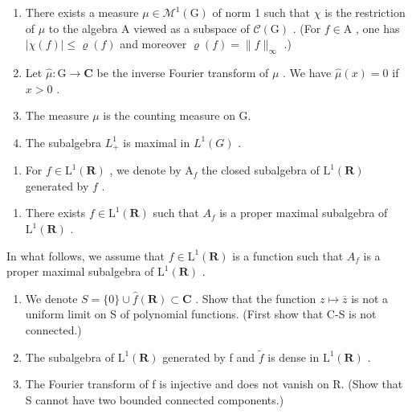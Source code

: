 \begin{enumerate}
\def\labelenumi{\alph{enumi})}
\setcounter{enumi}{4}
\item
  There exists a measure \(\mu \in \mathcal{M}^1 (\mathrm{G})\) of norm 1 such that \(\chi\) is the restriction of \(\mu\) to the algebra A viewed as a subspace of \(\mathcal{C}(\mathrm{G})\) . (For \(f\in \mathrm{A}\) , one has \(|\chi (f)|\leqslant \varrho (f)\) and moreover \(\varrho (f) = \| f\|_{\infty}\) .)
\item
  Let \(\widehat{\mu}\colon\mathrm{G}\to\mathbf{C}\) be the inverse Fourier transform of \(\mu\) . We have \(\widehat{\mu}(x)=0\) if \(x>0\) .
\item
  The measure \(\mu\) is the counting measure on G.
\item
  The subalgebra \(L_{+}^{1}\) is maximal in \(L^{1}(G)\) .
\end{enumerate}

\begin{enumerate}
\def\labelenumi{\arabic{enumi})}
\setcounter{enumi}{18}
\tightlist
\item
  For \(f \in \mathrm{L}^1(\mathbf{R})\) , we denote by \(\mathrm{A}_f\) the closed subalgebra of \(\mathrm{L}^1(\mathbf{R})\) generated by \(f\) .
\end{enumerate}

\begin{enumerate}
\def\labelenumi{\alph{enumi})}
\tightlist
\item
  There exists \(f \in \mathrm{L}^{1}(\mathbf{R})\) such that \(A_{f}\) is a proper maximal subalgebra of \(\mathrm{L}^{1}(\mathbf{R})\) .
\end{enumerate}

In what follows, we assume that \(f \in \mathrm{L}^{1}(\mathbf{R})\) is a function such that \(A_{f}\) is a proper maximal subalgebra of \(\mathrm{L}^{1}(\mathbf{R})\) .

\begin{enumerate}
\def\labelenumi{\alph{enumi})}
\setcounter{enumi}{1}
\item
  We denote \(S = \{0\} \cup \widehat{f}(\mathbf{R}) \subset \mathbf{C}\) . Show that the function \(z \mapsto \overline{z}\) is not a uniform limit on S of polynomial functions. (First show that C-S is not connected.)
\item
  The subalgebra of \(\mathrm{L}^{1}(\mathbf{R})\) generated by f and \(\widetilde{f}\) is dense in \(\mathrm{L}^{1}(\mathbf{R})\) .
\item
  The Fourier transform of f is injective and does not vanish on R. (Show that S cannot have two bounded connected components.)
\end{enumerate}

\backmatter
